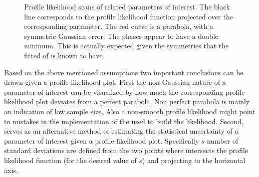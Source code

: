 \begin{figure}[!t]
  \centering
  \begin{subfigure}{0.5\textwidth}
    \raggedright
    \scalebox{0.57}{}
    \caption{}
    \label{nll_f0}
  \end{subfigure}%
  \hfill%
  \begin{subfigure}{0.5\textwidth}
    \raggedleft
    \scalebox{0.57}{}
    \caption{}
    \label{nll_fpar}
  \end{subfigure}
  \begin{subfigure}{0.5\textwidth}
    \raggedright
    \scalebox{0.57}{}
    \caption{}
    \label{nll_AparPhase}
  \end{subfigure}%
  \hfill%
  \begin{subfigure}{0.5\textwidth}
    \raggedleft
    \scalebox{0.57}{}
    \caption{}
    \label{nll_AperpPhase}
  \end{subfigure}
\caption{Profile likelihood scans of \pwave related parameters of interest. The black line corresponds to the profile likelihood
         function projected over the corresponding parameter. The red curve is a parabola, with a symmetric Gaussian
         error. The phases appear to have a double minimum. This is actually expected given the symmetries that the fitted \pdf
         of  is known to have.}
\end{figure}

Based on the above mentioned assumptions two important conclusions can be drawn given a profile likelihood plot. First the non
Gaussian nature of a parameter of interest can be visualized by how much the corresponding profile likelihood plot deviates from
a perfect parabola. Non perfect parabola is mainly an indication of low sample
size. Also a non-smooth profile likelihood might point to mistakes in the implementation of the \pdf
used to build the likelihood. Second,  serves as an alternative method of estimating the statistical uncertainty
of a parameter of interest given a profile likelihood plot. Specifically $s$ number of standard deviations are defined from the two
points where  intersects the profile likelihood function (for the desired value of $s$) and projecting to
the horizontal axis.

